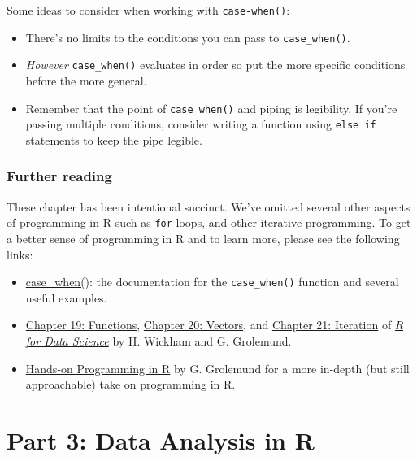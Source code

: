 \documentclass[
]{book}
\providecommand{\tightlist}{%
  \setlength{\itemsep}{0pt}\setlength{\parskip}{0pt}}
\begin{document}
Some ideas to consider when working with \texttt{case-when()}:

\begin{itemize}
\tightlist
\item
  There's no limits to the conditions you can pass to \texttt{case\_when()}.
\item
  \emph{However} \texttt{case\_when()} evaluates in order so put the more specific conditions before the more general.
\item
  Remember that the point of \texttt{case\_when()} and piping is legibility. If you're passing multiple conditions, consider writing a function using \texttt{else\ if} statements to keep the pipe legible.
\end{itemize}

\hypertarget{further-reading}{%
\section{Further reading}\label{further-reading}}

These chapter has been intentional succinct. We've omitted several other aspects of programming in R such as \texttt{for} loops, and other iterative programming. To get a better sense of programming in R and to learn more, please see the following links:

\begin{itemize}
\tightlist
\item
  \href{https://dplyr.tidyverse.org/reference/case_when.html}{case\_when()}: the documentation for the \texttt{case\_when()} function and several useful examples.
\item
  \href{https://r4ds.had.co.nz/functions.html}{Chapter 19: Functions}, \href{https://r4ds.had.co.nz/vectors.html}{Chapter 20: Vectors}, and \href{https://r4ds.had.co.nz/iteration.html}{Chapter 21: Iteration} of \href{https://r4ds.had.co.nz/index.html}{\emph{R for Data Science}} by H. Wickham and G. Grolemund.\\
\item
  \href{https://rstudio-education.github.io/hopr/}{Hands-on Programming in R} by G. Grolemund for a more in-depth (but still approachable) take on programming in R.
\end{itemize}

\hypertarget{part-part-3-data-analysis-in-r}{%
\part*{Part 3: Data Analysis in R}\label{part-part-3-data-analysis-in-r}}
\end{document}
